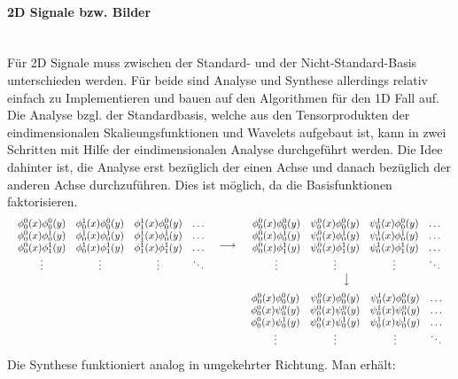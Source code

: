 \paragraph{2D Signale bzw. Bilder}~\\
Für 2D Signale muss zwischen der Standard- und der Nicht-Standard-Basis unterschieden werden. Für beide sind Analyse und Synthese allerdings relativ einfach zu Implementieren und bauen auf den Algorithmen für den 1D Fall auf.
Die Analyse bzgl. der Standardbasis, welche aus den Tensorprodukten der eindimensionalen Skalieungsfunktionen und Wavelets aufgebaut ist, kann in zwei Schritten mit Hilfe der eindimensionalen Analyse durchgeführt werden. Die Idee dahinter ist, die Analyse erst bezüglich der einen Achse und danach bezüglich der anderen Achse durchzuführen. Dies ist möglich, da die Basisfunktionen faktorisieren.
%
\[
\begin{array}{ccc}
{
\begin{array}{cccc}
\phi_0^0(x)\phi_0^0(y) & \phi_0^1(x)\phi_0^0(y) & \phi_1^1(x)\phi_0^0(y) & \hdots \\
\phi_0^0(x)\phi_0^1(y) & \phi_0^1(x)\phi_0^1(y) & \phi_1^1(x)\phi_0^1(y) & \hdots \\
\phi_0^0(x)\phi_1^1(y) & \phi_0^1(x)\phi_1^1(y) & \phi_1^1(x)\phi_1^1(y) & \hdots \\
\vdots & \vdots & \vdots & \ddots \\
\end{array}
} &
\longrightarrow &
{
\begin{array}{cccc}
\phi_0^0(x)\phi_0^0(y) & \psi_0^0(x)\phi_0^0(y) & \psi_0^1(x)\phi_0^0(y) & \hdots \\
\phi_0^0(x)\phi_0^1(y) & \psi_0^0(x)\phi_0^1(y) & \psi_0^1(x)\phi_0^1(y) & \hdots \\
\phi_0^0(x)\phi_1^1(y) & \psi_0^0(x)\phi_1^1(y) & \psi_0^1(x)\phi_1^1(y) & \hdots \\
\vdots & \vdots & \vdots & \ddots \\
\end{array}
} \\
 &
 &
\big\downarrow \\[.25cm]
 &
 &
{
\begin{array}{cccc}
\phi_0^0(x)\phi_0^0(y) & \psi_0^0(x)\phi_0^0(y) & \psi_0^1(x)\phi_0^0(y) & \hdots \\
\phi_0^0(x)\psi_0^0(y) & \psi_0^0(x)\psi_0^0(y) & \psi_0^1(x)\psi_0^0(y) & \hdots \\
\phi_0^0(x)\psi_0^1(y) & \psi_0^0(x)\psi_0^1(y) & \psi_0^1(x)\psi_0^1(y) & \hdots \\
\vdots & \vdots & \vdots & \ddots \\
\end{array}
}
\end{array}
\]
%
Die Synthese funktioniert analog in umgekehrter Richtung. Man erhält:

